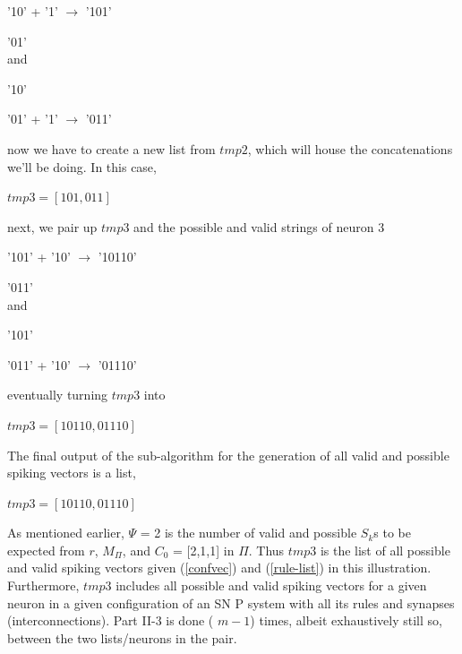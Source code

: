 \documentclass{svmultm}
\begin{document}
'10'  +	'1' $\rightarrow$ '101'

'01' 
\\
and 

'10'

'01'  +	'1' $\rightarrow$ '011'

now we have to create a new list from $tmp2$, which will house the concatenations we'll be doing. In this case, 

		$tmp3 = [ 101, 011 ] $

next, we pair up $tmp3$ and the possible and valid strings of neuron 3 

'101' + '10' $\rightarrow$ '10110'

'011'
\\ 
and 

'101'

'011' + '10' $\rightarrow$ '01110' 

eventually turning $tmp3$ into 

		$tmp3 = [ 10110, 01110 ]$ 

The final output of the sub-algorithm for the generation of all valid and possible spiking vectors is a list, 

		$tmp3 = [ 10110, 01110 ] $

As mentioned earlier, $\Psi$ = 2 is the number of valid and possible $S_k$s to be expected from $r$, $M_\Pi$, and $C_0$ = [2,1,1] in $\Pi$. Thus $tmp3$ is the list of all possible and valid spiking vectors given (\ref{confvec}) and (\ref{rule-list}) in this illustration. Furthermore, $tmp3$ includes all possible and valid spiking vectors for a given neuron in a given configuration of an SN P system with all its rules and 
synapses (interconnections). Part II-3 is done ( $m - 1$) times, albeit exhaustively still so, between the two lists/neurons in the pair. 
\end{document}
